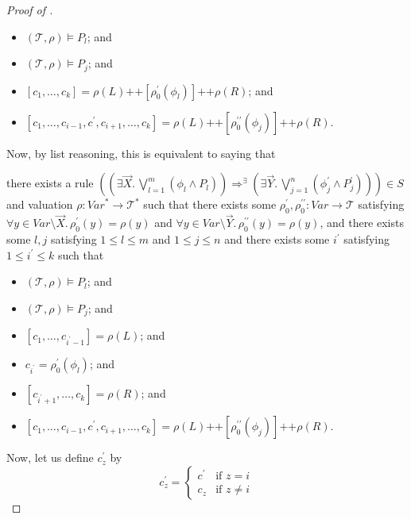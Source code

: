 \documentclass{article}
\newenvironment{proofenv}
  {
    \VerbatimEnvironment\begin{tcolorbox}[colback=black!0!white] %
  }
  {
   \end{tcolorbox}
  }
\begin{document}
\begin{proof}[Proof of ]
\begin{proofenv}
\begin{itemize}
    \item $(\mathcal{T}, \rho) \vDash P_l$; and
    \item $(\mathcal{T}, \rho) \vDash P_j$; and
    \item $[c_1,\ldots,c_k] = \rho(L) \texttt{++} [\rho_0^\prime(\phi_l)] \texttt{++} \rho(R)$; and
    \item $[c_1, \ldots, c_{i-1}, c^\prime, c_{i+1}, \ldots, c_k] = \rho(L)
    \texttt{++} [\rho_0^{\prime\prime}(\phi_j)] 
    \texttt{++} \rho(R)$.
\end{itemize}
\end{proofenv}
Now, by list reasoning, this is equivalent to
saying that
\begin{proofenv}
there exists a rule $((\exists \vec{X}.\, \bigvee_{l=1}^{m} (\phi_l \land P_l)) \Rightarrow^\exists (\exists \vec{Y}.\, \bigvee_{j=1}^{n} (\phi^\prime_j \land P^\prime_j))) \in S$
and valuation $\rho : \mathit{Var}^* \to \mathcal{T}^*$ such that
there exists some $\rho_0^\prime,\rho_0^{\prime\prime} : \mathit{Var} \to \mathcal{T}$
satisfying $\forall y \in \mathit{Var} \setminus \vec{X}.\, \rho_0^\prime(y) = \rho(y)$
and $\forall y \in \mathit{Var} \setminus \vec{Y}.\, \rho_0^{\prime\prime}(y) = \rho(y)$,
and there exists some $l,j$ satisfying $1 \leq l \leq m$ and $1 \leq j \leq n$
and there exists some $i^\prime$ satisfying $1 \leq i^\prime \leq k$
such that
\begin{itemize}
    \item $(\mathcal{T}, \rho) \vDash P_l$; and
    \item $(\mathcal{T}, \rho) \vDash P_j$; and
    \item $[c_1,\ldots, c_{i^\prime-1}] = \rho(L)$; and
    \item $c_{i^\prime} = \rho_0^\prime(\phi_l)$; and
    \item $[c_{i^\prime+1},\ldots,c_k] = \rho(R)$; and
    \item $[c_1, \ldots, c_{i-1}, c^\prime, c_{i+1}, \ldots, c_k] = \rho(L)
    \texttt{++} [\rho_0^{\prime\prime}(\phi_j)] 
    \texttt{++} \rho(R)$.
\end{itemize}
\end{proofenv}
Now, let us define $c^\prime_{z}$ by
\begin{equation*}
c^\prime_{z} =
    \begin{cases}
        c^\prime & \text{if } z = i \\
        c_z & \text{if } z \not = i
    \end{cases}

\end{equation*}
\end{proof}
\end{document}
